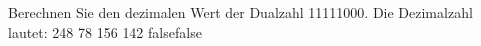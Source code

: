     {Berechnen Sie den dezimalen Wert der Dualzahl 11111000. Die Dezimalzahl lautet:}
    {248}
    {78}
    {156}
    {142}
    {false}{false}